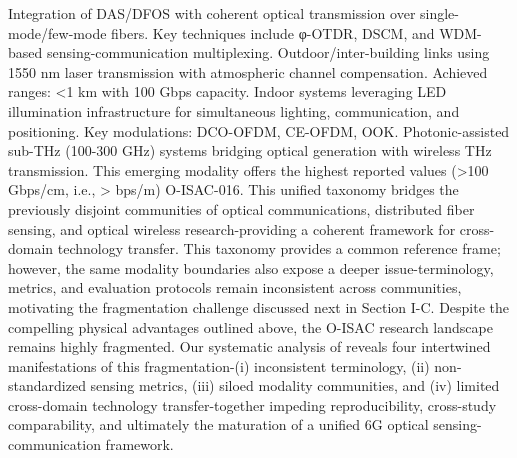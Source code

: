 {}\markdownRendererOlBegin
{} Integration of DAS/DFOS with coherent optical transmission over single-mode/few-mode fibers. Key techniques include φ-OTDR, DSCM, and WDM-based sensing-communication multiplexing.\markdownRendererOlItemEnd 
{} Outdoor/inter-building links using 1550 nm laser transmission with atmospheric channel compensation. Achieved ranges: <1 km with 100 Gbps capacity.\markdownRendererOlItemEnd 
{} Indoor systems leveraging LED illumination infrastructure for simultaneous lighting, communication, and positioning. Key modulations: DCO-OFDM, CE-OFDM, OOK.\markdownRendererOlItemEnd 
{} Photonic-assisted sub-THz (100-300 GHz) systems bridging optical generation with wireless THz transmission. This emerging modality offers the highest reported  values (>100 Gbps/cm, i.e., > bps/m) O-ISAC-016.\markdownRendererOlItemEnd 
\markdownRendererOlEnd \markdownRendererInterblockSeparator
{}This unified taxonomy bridges the previously disjoint communities of optical communications, distributed fiber sensing, and optical wireless research-providing a coherent framework for cross-domain technology transfer. This taxonomy provides a common reference frame; however, the same modality boundaries also expose a deeper issue-terminology, metrics, and evaluation protocols remain inconsistent across communities, motivating the fragmentation challenge discussed next in Section I-C.\markdownRendererInterblockSeparator
{}
\markdownRendererSectionEnd 
\markdownRendererSectionEnd \markdownRendererSectionBegin
{}\markdownRendererInterblockSeparator
{}Despite the compelling physical advantages outlined above, the O-ISAC research landscape remains highly fragmented. Our systematic analysis of  reveals four intertwined manifestations of this fragmentation-(i) inconsistent terminology, (ii) non-standardized sensing metrics, (iii) siloed modality communities, and (iv) limited cross-domain technology transfer-together impeding reproducibility, cross-study comparability, and ultimately the maturation of a unified 6G optical sensing-communication framework.\markdownRendererParagraphSeparator
